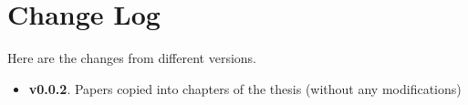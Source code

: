 

\chapter*{Change Log}

Here are the changes from different versions.

\begin{itemize}
	\item \textbf{v0.0.2}. Papers copied into chapters of the thesis (without any modifications) 
	
\end{itemize}